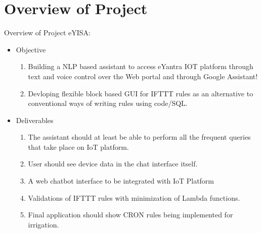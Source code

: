 \documentclass[10pt, a4paper]{beamer}
\begin{document}
\section{Overview of Project}
\begin{frame}{Overview of Project}
	eYISA:
	\begin{itemize}
		\item Objective
		\begin{enumerate}	
			\item Building a NLP based assistant to access eYantra IOT platform  through text and voice control over the Web portal and through Google Assistant!
			\item Devloping flexible block based GUI for IFTTT rules as an alternative to conventional ways of writing rules using code/SQL.
		\end{enumerate}
		\item Deliverables 
		\begin{enumerate}
			\item The assistant should at least be able to perform all the frequent queries that take place on IoT platform.
			\item User should see device data in the chat interface itself.
			\item A web chatbot interface to be integrated with IoT Platform
			\item Validations of IFTTT rules with minimization of Lambda functions.
			\item Final application should show CRON rules being implemented for irrigation.
		\end{enumerate}
	\end{itemize}
\end{frame}
\end{document}
